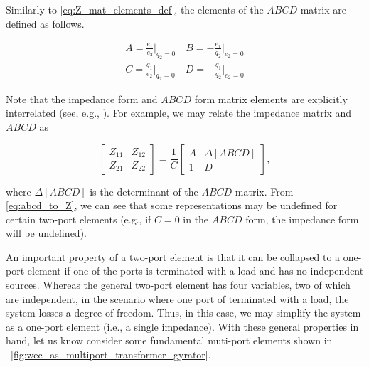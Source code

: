 \documentclass[lettersize,journal]{IEEEtran}
\begin{document}
\noindent{}Similarly to \eqref{eq:Z_mat_elements_def}, the elements of the $ABCD$ matrix are defined as follows.

\begin{subequations} \label{eq:abcd_mat_elements_def}
        \begin{align}
                A = \frac{e_1}{e_2} \bigg \vert_{q_2=0}  \quad
                B = - \frac{e_1}{q_2} \bigg \vert_{e_2=0}  \\[1em]
                C = \frac{q_1}{e_2} \bigg \vert_{q_2=0}  \quad
                D = - \frac{q_1}{q_2} \bigg \vert_{e_2=0} 
        \end{align}
\end{subequations}

\noindent{}Note that the impedance form and $ABCD$ form matrix elements are explicitly interrelated (see, e.g., \cite{Frickey:1994aa}).
For example, we may relate the impedance matrix and $ABCD$ as

\begin{equation}
        \begin{bmatrix}
                Z_{11} & Z_{12} \\ Z_{21} & Z_{22}
        \end{bmatrix}
        =
        \frac{1}{C}
        \begin{bmatrix}
                A & \Delta\left[ ABCD \right] \\ 1 & D
        \end{bmatrix} ,
\label{eq:abcd_to_Z}
\end{equation}

\noindent{}where $\Delta\left[ ABCD \right]$ is the determinant of the $ABCD$ matrix.
From \eqref{eq:abcd_to_Z}, we can see that some representations may be undefined for certain two-port elements (e.g., if $C=0$ in the $ABCD$ form, the impedance form will be undefined).

An important property of a two-port element is that it can be collapsed to a one-port element if one of the ports is terminated with a load and has no independent sources.
Whereas the general two-port element has four variables, two of which are independent, in the scenario where one port of terminated with a load, the system losses a degree of freedom.
Thus, in this case, we may simplify the system as a one-port element (i.e., a single impedance).
With these general properties in hand, let us know consider some fundamental muti-port elements shown in \figurename~\ref{fig:wec_as_multiport_transformer_gyrator}.
\end{document}
